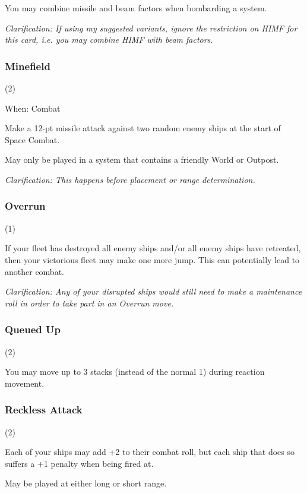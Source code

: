 \documentclass[a4paper,11pt,twocolumn]{article}
\begin{document}
You may combine missile and beam factors when bombarding a system.

\textit{Clarification: If using my suggested variants, ignore the restriction on HIMF for this card, i.e. you may combine HIMF with beam factors.}

\subsubsection{Minefield} (2)

When: Combat

Make a 12-pt missile attack against two random enemy ships at the start of Space Combat.

May only be played in a system that contains a friendly World or Outpost.

\textit{Clarification: This happens before placement or range determination.}

\subsubsection{Overrun} (1)


If your fleet has destroyed all enemy ships and/or all enemy ships have retreated, then your victorious fleet may make one more jump. This can potentially lead to another combat.

\textit{Clarification: Any of your disrupted ships would still need to make a maintenance roll in order to take part in an Overrun move.}

\subsubsection{Queued Up} (2)


You may move up to 3 stacks (instead of the normal 1) during reaction movement.

\subsubsection{Reckless Attack} (2)


Each of your ships may add +2 to their combat roll, but each ship that does so suffers a +1 penalty when being fired at.

May be played at either long or short range.
\end{document}
